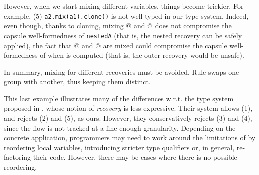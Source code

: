 However, when we start mixing different variables, things become trickier.
 For example, (5) \lstinline{a2.mix(a1).clone()}{} is not well-typed in our type system.
  Indeed, even though, thanks to cloning, mixing @
 and @ does not compromise the capsule well-formedness of \lstinline{nestedA}{} (that is, the nested recovery can be safely applied), the fact that @ and 
 @ are mixed could compromise the capsule well-formedness of \Q@outerA@ when \Q@outerA@ is computed (that is, the outer recovery would be unsafe).

In summary, mixing  for different {recoveries} must be avoided.
Rule  swaps one group with another,
thus keeping them distinct.

This last example \label{comparison} illustrates many of the differences w.r.t. {the type system proposed in \cite{GordonEtAl12}, whose notion of \emph{recovery} is less expressive}.
Their system allows (1), and rejects (2) and (5), as ours. However, they conservatively rejects (3) and (4), since 
 the flow is not tracked at a fine enough granularity.
Depending on the concrete application, programmers may need to work around the
limitations of \cite{GordonEtAl12} by reordering local variables,
 introducing stricter type qualifiers or, in general, re-factoring their code.
 However, there may be cases where there is no possible reordering.